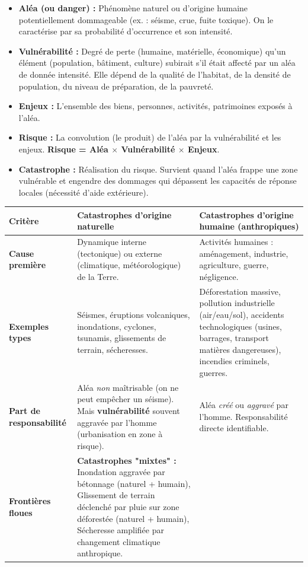 \documentclass[11pt]{article}
\newcommand{\cle}[1]{{\popxbold\color{popdark}#1}}
\begin{document}
\begin{definition}
\begin{itemize}
    \item \textbf{Aléa (ou danger) :} Phénomène naturel ou d'origine humaine potentiellement dommageable (ex. : séisme, crue, fuite toxique). On le caractérise par sa \cle{probabilité d'occurrence} et son \cle{intensité}.
    \item \textbf{Vulnérabilité :} Degré de perte (humaine, matérielle, économique) qu'un élément (population, bâtiment, culture) subirait s'il était affecté par un aléa de donnée intensité. Elle dépend de la \cle{qualité de l'habitat}, de la \cle{densité de population}, du \cle{niveau de préparation}, de la \cle{pauvreté}.
    \item \textbf{Enjeux :} L'ensemble des biens, personnes, activités, patrimoines exposés à l'aléa.
    \item \textbf{Risque :} La convolution (le produit) de l'aléa par la vulnérabilité et les enjeux. \textbf{Risque = Aléa $\times$ Vulnérabilité $\times$ Enjeux}.
    \item \textbf{Catastrophe :} Réalisation du risque. Survient quand l'aléa frappe une zone vulnérable et engendre des dommages qui dépassent les capacités de réponse locales (nécessité d'aide extérieure).
\end{itemize}
\end{definition}

\begin{propriete}
\begin{center}
\begin{tabularx}{\linewidth}{|l|X|X|}\hline
\textbf{Critère} & \textbf{Catastrophes d'origine naturelle} & \textbf{Catastrophes d'origine humaine (anthropiques)} \\ \hline
\textbf{Cause première} & Dynamique interne (tectonique) ou externe (climatique, météorologique) de la Terre. & Activités humaines : aménagement, industrie, agriculture, guerre, négligence. \\ \hline
\textbf{Exemples types} & Séismes, éruptions volcaniques, inondations, cyclones, tsunamis, glissements de terrain, sécheresses. & Déforestation massive, pollution industrielle (air/eau/sol), accidents technologiques (usines, barrages, transport matières dangereuses), incendies criminels, guerres. \\ \hline
\textbf{Part de responsabilité} & Aléa \emph{non} maîtrisable (on ne peut empêcher un séisme). Mais \textbf{vulnérabilité} souvent aggravée par l'homme (urbanisation en zone à risque). & Aléa \emph{créé} ou \emph{aggravé} par l'homme. Responsabilité directe identifiable. \\ \hline
\textbf{Frontières floues} & \textbf{Catastrophes "mixtes" :} Inondation aggravée par bétonnage (naturel + humain), Glissement de terrain déclenché par pluie sur zone déforestée (naturel + humain), Sécheresse amplifiée par changement climatique anthropique. & \\
\hline
\end{tabularx}
\end{center}
\end{propriete}
\end{document}
